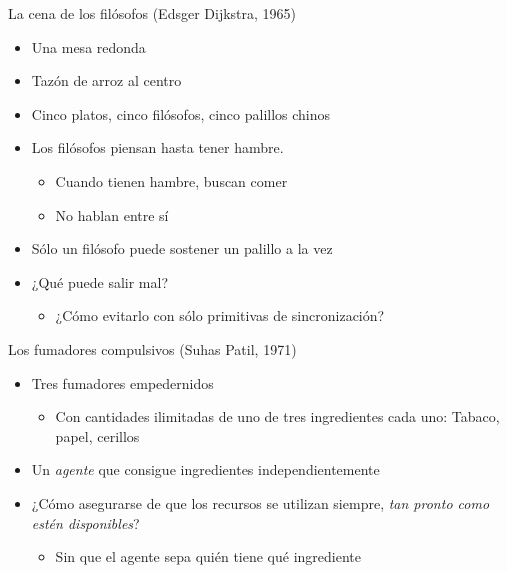 \documentclass[presentation]{beamer}
\begin{document}
\begin{frame}[label={sec:org800e85a}]{La cena de los filósofos (Edsger Dijkstra, 1965)}
\begin{itemize}
\item Una mesa redonda
\item Tazón de arroz al centro
\item Cinco platos, cinco filósofos, cinco palillos chinos
\item Los filósofos piensan hasta tener hambre.
\begin{itemize}
\item Cuando tienen hambre, buscan comer
\item No hablan entre sí
\end{itemize}
\item Sólo un filósofo puede sostener un palillo a la vez
\item ¿Qué puede salir mal?
\begin{itemize}
\item ¿Cómo evitarlo con sólo primitivas de sincronización?
\end{itemize}
\end{itemize}
\end{frame}

\begin{frame}[label={sec:org935603f}]{Los fumadores compulsivos (Suhas Patil, 1971)}
\begin{itemize}
\item Tres fumadores empedernidos
\begin{itemize}
\item Con cantidades ilimitadas de uno de tres ingredientes cada uno:
Tabaco, papel, cerillos
\end{itemize}
\item Un \emph{agente} que consigue ingredientes independientemente
\item ¿Cómo asegurarse de que los recursos se utilizan siempre, \emph{tan
pronto como estén disponibles}?
\begin{itemize}
\item Sin que el agente sepa quién tiene qué ingrediente
\end{itemize}
\end{itemize}
\end{frame}
\end{document}
